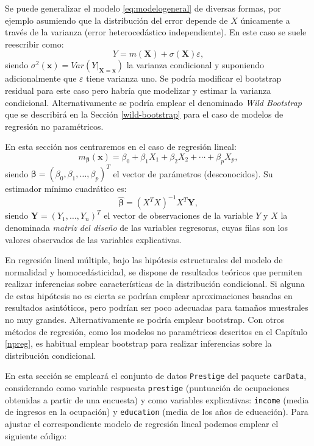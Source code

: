 \documentclass[
]{book}
\theoremstyle{break}
\theoremstyle{definition}
\theoremstyle{definition}
\theoremstyle{definition}
\theoremstyle{definition}
\theoremstyle{remark}
\begin{document}
Se puede generalizar el modelo \eqref{eq:modelogeneral} de diversas formas, por ejemplo asumiendo que la distribución del error depende de \(X\) únicamente a través de la varianza (error heterocedástico independiente).
En este caso se suele reescribir como:
\[Y = m(\mathbf{X}) + \sigma(\mathbf{X}) \varepsilon,\]
siendo \(\sigma^2(\mathbf{x}) = Var\left( \left. Y\right\vert_{\mathbf{X}=\mathbf{x}} \right)\) la varianza condicional y suponiendo adicionalmente que \(\varepsilon\) tiene varianza uno.
Se podría modificar el bootstrap residual para este caso pero habría que modelizar y estimar la varianza condicional.
Alternativamente se podría emplear el denominado \emph{Wild Bootstrap} que se describirá en la Sección \ref{wild-bootstrap} para el caso de modelos de regresión no paramétricos.

En esta sección nos centraremos en el caso de regresión lineal:
\[m_{\boldsymbol{\beta}}(\mathbf{x}) =  \beta_{0} + \beta_{1}X_{1} + \beta_{2}X_{2} + \cdots + \beta_{p}X_{p},\]
siendo \(\boldsymbol{\beta} = \left( \beta_{0}, \beta_{1}, \ldots, \beta_{p} \right)^{T}\) el vector de parámetros (desconocidos).
Su estimador mínimo cuadrático es:
\[\boldsymbol{\hat{\beta}} = \left( X^{T}X\right)^{-1}X^{T}\mathbf{Y},\]
siendo \(\mathbf{Y} = \left( Y_{1}, \ldots, Y_{n} \right)^{T}\) el vector de observaciones de la variable \(Y\) y \(X\) la denominada \emph{matriz del diseño} de las variables regresoras, cuyas filas son los valores observados de las variables explicativas.

En regresión lineal múltiple, bajo las hipótesis estructurales del modelo de normalidad y homocedásticidad, se dispone de resultados teóricos que permiten realizar inferencias sobre características de la distribución condicional. Si alguna de estas hipótesis no es cierta se podrían emplear aproximaciones basadas en resultados asintóticos, pero podrían ser poco adecuadas para tamaños muestrales no muy grandes. Alternativamente se podría emplear bootstrap.
Con otros métodos de regresión, como los modelos no paramétricos descritos en el Capítulo \ref{npreg}, es habitual emplear bootstrap para realizar inferencias sobre la distribución condicional.

En esta sección se empleará el conjunto de datos \texttt{Prestige} del paquete \texttt{carData}, considerando como variable respuesta \texttt{prestige} (puntuación de ocupaciones obtenidas a partir de una encuesta) y como variables explicativas: \texttt{income} (media de ingresos en la ocupación) y \texttt{education} (media de los años de educación).
Para ajustar el correspondiente modelo de regresión lineal podemos emplear el siguiente código:
\end{document}
